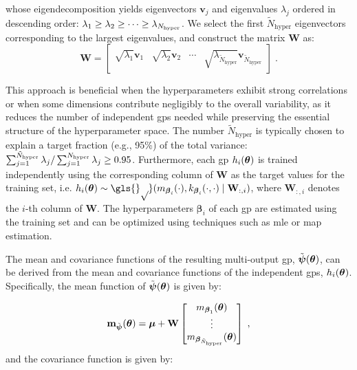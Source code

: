 whose eigendecomposition yields eigenvectors $\mathbf{v}_j$ and eigenvalues $\lambda_j$ ordered in descending order: $\lambda_1 \geq \lambda_2 \geq \cdots \geq \lambda_{N_{\mathrm{hyper}}}$. We select the first $\tilde{N}_{\mathrm{hyper}}$ eigenvectors corresponding to the largest eigenvalues, and construct the matrix $\mathbf{W}$ as:
\begin{equation}
  \mathbf{W} = \begin{bmatrix} \sqrt{\lambda_1} \mathbf{v}_1 & \sqrt{\lambda_2} \mathbf{v}_2 & \cdots & \sqrt{\lambda_{\tilde{N}_{\mathrm{hyper}}}} \mathbf{v}_{\tilde{N}_{\mathrm{hyper}}} \end{bmatrix} \;.
  \label{eq:pca_loadings}
\end{equation}

This approach is beneficial when the hyperparameters exhibit strong correlations or when some dimensions contribute negligibly to the overall variability, as it reduces the number of independent \glspl{gp} needed while preserving the essential structure of the hyperparameter space. The number $\tilde{N}_{\mathrm{hyper}}$ is typically chosen to explain a target fraction (e.g., 95\%) of the total variance: $\sum_{j=1}^{\tilde{N}_{\mathrm{hyper}}} \lambda_j / \sum_{j=1}^{N_{\mathrm{hyper}}} \lambda_j \geq 0.95$. Furthermore, each \gls{gp} $h_i(\boldsymbol{\theta})$ is trained independently using the corresponding column of $\mathbf{W}$ as the target values for the training set, i.e. $h_i(\btheta) \sim \mathcal{\gls{gp}}(m_{\boldsymbol{\beta}_i}(\cdot), k_{\boldsymbol{\beta}_i}(\cdot, \cdot) \mid \mathbf{W}_{:, i})$, where $\mathbf{W}_{:, i}$ denotes the $i$-th column of $\mathbf{W}$. The hyperparameters $\boldsymbol{\beta}_i$ of each \gls{gp} are estimated using the training set and can be optimized using techniques such as \gls{mle} or \gls{map} estimation. 

\smallskip
The mean and covariance functions of the resulting multi-output \gls{gp}, $\tilde{\boldsymbol{\psi}}(\boldsymbol{\theta})$, can be derived from the mean and covariance functions of the independent \glspl{gp}, $h_i(\boldsymbol{\theta})$. Specifically, the mean function of $\tilde{\boldsymbol{\psi}}(\boldsymbol{\theta})$ is given by:

\begin{equation}
  \mathbf{m}_{\tilde{\boldsymbol{\psi}}}(\boldsymbol{\theta}) = \boldsymbol{\mu} + \mathbf{W} \begin{bmatrix} m_{\boldsymbol{\beta}_1}(\boldsymbol{\theta}) \\ \vdots \\ m_{\boldsymbol{\beta}_{\tilde{N}_{\mathrm{hyper}}}}(\boldsymbol{\theta}) \end{bmatrix} \;,
  \label{eq:multiout_mean}
\end{equation}
and the covariance function is given by:

